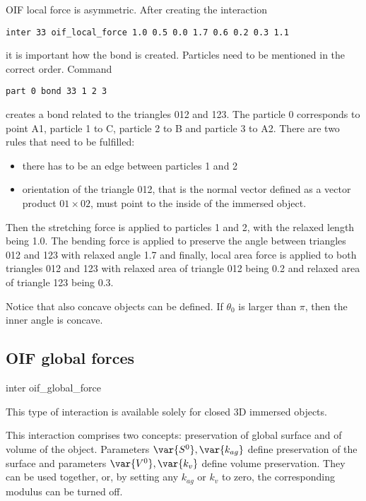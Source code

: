OIF local force is asymmetric. After creating the interaction
\begin{verbatim} 
inter 33 oif_local_force 1.0 0.5 0.0 1.7 0.6 0.2 0.3 1.1
\end{verbatim}
it is important how the bond is created. Particles need to be mentioned in the 
correct order. Command
\begin{verbatim} 
part 0 bond 33 1 2 3
\end{verbatim}
creates a bond related to the triangles 012 and 123. The particle 
0 corresponds to point A1, particle 1 to C, particle 2 to B and particle 3 to A2. 
There are two rules that need to be fulfilled:
\begin{itemize}
\item there has to be an edge between particles 1 and 2
\item orientation of the triangle 012, that is the normal vector 
defined as a vector product $01 \times 02$, must point to the inside of the immersed 
object.
\end{itemize}
Then the stretching force is applied to particles 1 and 2, with the relaxed length being 1.0. The bending force is applied to preserve the angle between triangles 012 and 123 with relaxed angle 1.7 and finally, local area force is applied to both triangles 012 and 123 with relaxed area of triangle 012 being 0.2 and relaxed area of triangle 123 being 0.3.
 
Notice that also concave objects can be defined. If $\theta_0$ is larger than $\pi$, 
then the inner angle is concave.


\subsection{OIF global forces}

\begin{essyntax}
  inter 
  oif_global_force
       
   \begin{features}
  \end{features}
\end{essyntax}
This type of interaction is available solely for closed 3D immersed objects.

This interaction comprises two concepts: preservation of global surface and of volume of the object. Parameters $\var{S^0}, \var{k_{ag}}$ define preservation of the surface and parameters $  \var{V^0}, \var{k_{v}}$ define volume preservation. They can be used together, or, by setting any $k_{ag}$ or $k_{v}$ to zero, the corresponding modulus can be turned off.

